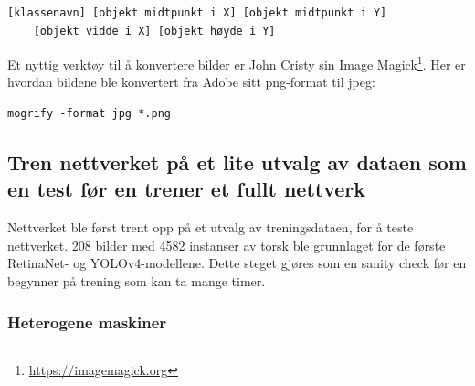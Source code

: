 \begin{verbatim}
[klassenavn] [objekt midtpunkt i X] [objekt midtpunkt i Y]
	[objekt vidde i X] [objekt høyde i Y]
\end{verbatim}

Et nyttig verktøy til å konvertere bilder er John Cristy sin Image Magick\footnote{\url{https://imagemagick.org}}. Her er hvordan bildene ble konvertert fra Adobe sitt png-format til jpeg:

\begin{verbatim}
mogrify -format jpg *.png
\end{verbatim}

\subsection{Tren nettverket på et lite utvalg av dataen som en test før en trener et fullt nettverk}

Nettverket ble først trent opp på et utvalg av treningsdataen, for å teste nettverket. 208 bilder med 4582 instanser av torsk ble grunnlaget for de første RetinaNet- og YOLOv4-modellene. Dette steget gjøres som en sanity check før en begynner på trening som kan ta mange timer.

\subsubsection{Heterogene maskiner}


